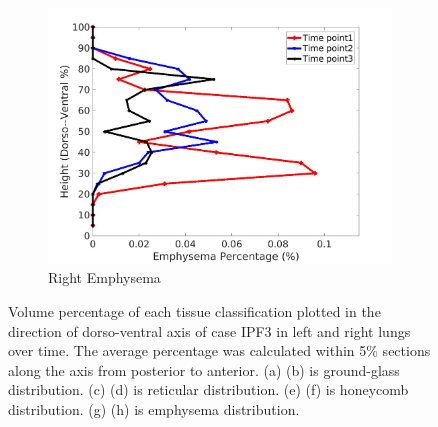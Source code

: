 \begin{figure}[H]
\begin{subfigure}{.42\linewidth}
  \includegraphics[width=\linewidth,trim={{.0\wd0} {.0\wd0} {.0\wd0} {.0\wd0}},clip]{Appendix/Image_AppexA/DorsoToVentral/IPF3RightLungEmphysemaDiseaseDorsoToVentral.jpg}
  \caption{Right Emphysema}
  \label{fig:IPF3DiseaseDorsoToVentral-h}
\end{subfigure}
\caption{Volume percentage of each tissue classification plotted in the direction of dorso-ventral axis of case IPF3 in left and right lungs over time. The average percentage was calculated within 5\% sections along the axis from posterior to anterior. (a) (b) is ground-glass distribution. (c) (d) is reticular distribution. (e) (f) is honeycomb distribution. (g) (h) is emphysema distribution.}
\label{fig:IPF3DiseaseDorsoToVentral}
\end{figure}

